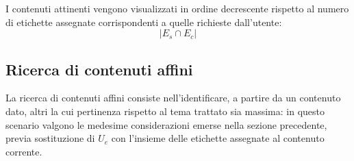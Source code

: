 \documentclass[10pt,a4paper,headinclude,footinclude,hidelinks]{scrreprt} %
\begin{document}
	I contenuti attinenti vengono visualizzati in ordine decrescente rispetto al numero di etichette assegnate corrispondenti a quelle richieste dall'utente:
	$$\left|{E_s \cap E_c}\right|$$
	\subsection{Ricerca di contenuti affini}
	La ricerca di contenuti affini consiste nell'identificare, a partire da un contenuto dato, altri la cui pertinenza rispetto al tema trattato sia massima: in questo scenario valgono le medesime considerazioni emerse nella sezione precedente, previa sostituzione di $U_e$ con l'insieme delle etichette assegnate al contenuto corrente.

\end{document}
